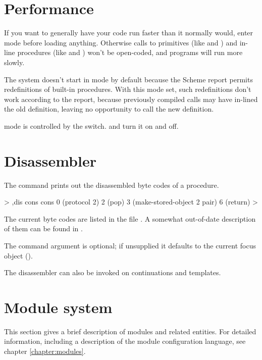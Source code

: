 \section{Performance}
\label{section:performance}

If you want to generally have your code run faster than it normally
would, enter  mode before loading anything.  Otherwise
calls to primitives (like \code{+} and ) and in-line procedures
(like  and ) won't be open-coded, and programs will run
more slowly.

The system doesn't start in  mode by default because the
Scheme report permits redefinitions of built-in procedures.  With
this mode set, such redefinitions don't work according to the report,
because previously compiled calls may have in-lined the old
definition, leaving no opportunity to call the new definition.

 mode is controlled by the  switch.
 and  turn it on and off.

\section{Disassembler}

The  command prints out the disassembled byte codes of a procedure.
\begin{example}
> ,dis cons
cons
  0 (protocol 2)
  2 (pop)
  3 (make-stored-object 2 pair)
  6 (return)
> 
\end{example}
The current byte codes are listed in the file .
A somewhat out-of-date description of them can be found in
\cite{Kelsey-Rees:Scheme48}.

The command argument is optional; if unsupplied it defaults to the
current focus object (\code{\#\#}).

The disassembler can also be invoked on continuations and templates.

\section{Module system}
\label{module-guide}

This section gives a brief description of modules and related entities.
For detailed information, including a description of the module
 configuration language, see 
chapter \ref{chapter:modules}.

